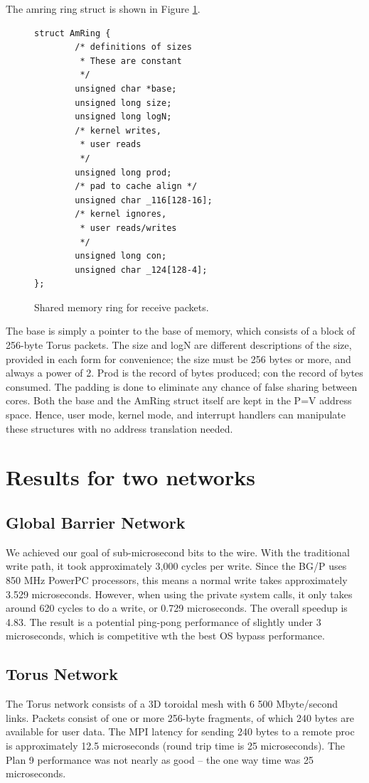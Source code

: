 \documentclass[letterpaper,twocolumn,10pt]{article}
\begin{document}
The amring ring struct is shown in Figure \ref{ring}. 
\begin{figure}
\begin{verbatim}
struct AmRing {
        /* definitions of sizes
         * These are constant
         */
        unsigned char *base;
        unsigned long size;
        unsigned long logN;
        /* kernel writes,
         * user reads
         */
        unsigned long prod;
        /* pad to cache align */
        unsigned char _116[128-16];
        /* kernel ignores, 
         * user reads/writes
         */
        unsigned long con;
        unsigned char _124[128-4];
};
\end{verbatim}
\caption{\label{ring}Shared memory ring for receive packets.}
\end{figure}
The base is simply a pointer to the base of memory, which consists of a block of 256-byte Torus packets. 
The size and logN are different descriptions of the size, provided in each form for convenience;
 the size must be 256 bytes or more, and always a power of 2. Prod
is the record of bytes produced; con the record of bytes consumed. The padding is done to eliminate any 
chance of false sharing between cores. Both the base and the AmRing struct itself are kept in the P=V 
address space. Hence, user mode, kernel mode, and interrupt handlers can manipulate these structures
with no address translation needed. 

\section{Results for two networks}
\subsection{Global Barrier Network}
We achieved our goal of sub-microsecond bits to the wire. With the traditional write path, it took approximately 3,000 cycles per write. Since the BG/P uses 850 MHz PowerPC processors, this means a normal write takes approximately 3.529 microseconds. However, when using the private system calls, it only takes around 620 cycles to do a write, or 0.729 microseconds. The overall speedup is 4.83. 
The result is a potential ping-pong performance of slightly under 3 microseconds, which is competitive wth the best OS bypass performance. 

\subsection{Torus Network}
The Torus network consists of a 3D toroidal mesh with 6 500 Mbyte/second links. Packets consist of one or more 
256-byte fragments, of which 240 bytes are available for user data. The MPI latency for sending 240  bytes to a remote 
proc is approximately 12.5 microseconds (round trip time is 25 microseconds). The Plan 9 performance was not nearly as good -- the one way time was 25 microseconds. 
\end{document}
